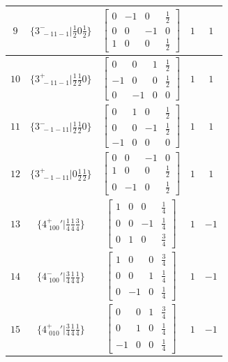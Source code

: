 \documentclass[fleqn,8pt]{jsarticle}
\begin{document}
\begin{longtable}{ccccc}
$ 9 $ & $ \{3^{-}_{\,\,-11-1}|\frac{1}{2} 0 \frac{1}{2}\} $ & $ \begin{bmatrix} 0 & -1 & 0 & \frac{1}{2} \\ 0 & 0 & -1 & 0 \\ 1 & 0 & 0 & \frac{1}{2} \end{bmatrix} $ & $ 1 $ & $ 1 $ \\ \hline
$ 10 $ & $ \{3^{+}_{\,\,-11-1}|\frac{1}{2} \frac{1}{2} 0\} $ & $ \begin{bmatrix} 0 & 0 & 1 & \frac{1}{2} \\ -1 & 0 & 0 & \frac{1}{2} \\ 0 & -1 & 0 & 0 \end{bmatrix} $ & $ 1 $ & $ 1 $ \\ \hline
$ 11 $ & $ \{3^{-}_{\,\,-1-11}|\frac{1}{2} \frac{1}{2} 0\} $ & $ \begin{bmatrix} 0 & 1 & 0 & \frac{1}{2} \\ 0 & 0 & -1 & \frac{1}{2} \\ -1 & 0 & 0 & 0 \end{bmatrix} $ & $ 1 $ & $ 1 $ \\ \hline
$ 12 $ & $ \{3^{+}_{\,\,-1-11}|0 \frac{1}{2} \frac{1}{2}\} $ & $ \begin{bmatrix} 0 & 0 & -1 & 0 \\ 1 & 0 & 0 & \frac{1}{2} \\ 0 & -1 & 0 & \frac{1}{2} \end{bmatrix} $ & $ 1 $ & $ 1 $ \\ \hline
$ 13 $ & $ \{4^{+}_{\,\,100}{}'|\frac{1}{4} \frac{1}{4} \frac{3}{4}\} $ & $ \begin{bmatrix} 1 & 0 & 0 & \frac{1}{4} \\ 0 & 0 & -1 & \frac{1}{4} \\ 0 & 1 & 0 & \frac{3}{4} \end{bmatrix} $ & $ 1 $ & $ -1 $ \\ \hline
$ 14 $ & $ \{4^{-}_{\,\,100}{}'|\frac{3}{4} \frac{1}{4} \frac{1}{4}\} $ & $ \begin{bmatrix} 1 & 0 & 0 & \frac{3}{4} \\ 0 & 0 & 1 & \frac{1}{4} \\ 0 & -1 & 0 & \frac{1}{4} \end{bmatrix} $ & $ 1 $ & $ -1 $ \\ \hline
$ 15 $ & $ \{4^{+}_{\,\,010}{}'|\frac{3}{4} \frac{1}{4} \frac{1}{4}\} $ & $ \begin{bmatrix} 0 & 0 & 1 & \frac{3}{4} \\ 0 & 1 & 0 & \frac{1}{4} \\ -1 & 0 & 0 & \frac{1}{4} \end{bmatrix} $ & $ 1 $ & $ -1 $ \\ \hline

\end{longtable}
\end{document}
